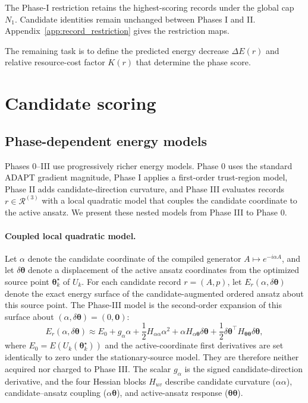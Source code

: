\documentclass[
  reprint,
  amsmath,
  amssymb,
  aps,
  pra,
  nofootinbib,
  superscriptaddress,
  floatfix
]{revtex4-2}
\begin{document}
The Phase-I restriction retains the highest-scoring records under the global
cap \(N_1\). Candidate identities remain unchanged between Phases I and II.
Appendix~\ref{app:record_restriction} gives the restriction maps.

The remaining task is to define the predicted energy decrease \(\Delta E(r)\) and relative resource-cost factor \(K(r)\) that determine the phase score.

\section{Candidate scoring}
\subsection{Phase-dependent energy models}
\label{subsec:candidate_energy_models}
%
Phases 0--III use progressively richer energy models. Phase 0 uses the standard
ADAPT gradient magnitude, Phase I applies a first-order trust-region model,
Phase II adds candidate-direction curvature, and Phase III evaluates records
\(r\in\mathcal R^{(3)}\) with a local quadratic model that couples the
candidate coordinate to the active ansatz. We present these nested models from
Phase III to Phase 0.
\paragraph*{Coupled local quadratic model.}
%
Let \(\alpha\) denote the candidate coordinate of the compiled generator
\(A\mapsto e^{-i\alpha A}\), and let \(\delta\boldsymbol{\theta}\) denote a
displacement of the active ansatz coordinates from the optimized source point
\(\boldsymbol{\theta}_k^\star\) of \(U_k\). For each candidate record \(r=(A,p)\), let
\(E_r(\alpha,\delta\boldsymbol{\theta})\) denote the exact energy surface of
the candidate-augmented ordered ansatz about this source point.
The Phase-III model is the second-order expansion of this surface about
\((\alpha,\delta\boldsymbol{\theta})=(0,\mathbf 0)\):
\begin{equation}
E_r(\alpha,\delta\boldsymbol{\theta})
\approx
E_0
+ g_{\alpha}\alpha
+ \frac{1}{2}H_{\alpha\alpha}\alpha^2
+ \alpha H_{\alpha\boldsymbol\theta}\delta\boldsymbol{\theta}
+ \frac{1}{2}\delta\boldsymbol{\theta}^{\top}
H_{\boldsymbol\theta\boldsymbol\theta}\delta\boldsymbol{\theta},
\label{eq:local_quadratic}
\end{equation}
where \(E_0=E(U_k(\boldsymbol\theta_k^\star))\) and the active-coordinate first
derivatives are set identically to zero under the stationary-source model. They
are therefore neither acquired nor charged to Phase III. The scalar \(g_\alpha\)
is the signed candidate-direction derivative,
and the four Hessian blocks $H_{uv}$ describe
candidate curvature ($\alpha\alpha$), candidate--ansatz coupling
($\alpha\boldsymbol\theta$), and active-ansatz response
($\boldsymbol\theta\boldsymbol\theta$).
\end{document}
